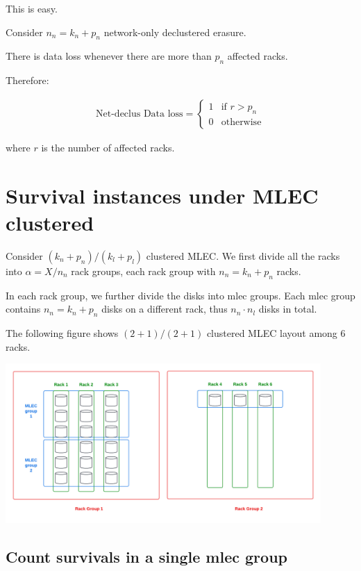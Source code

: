 \documentclass{article}
\begin{document}
This is easy.

Consider $n_n=k_n+p_n$ network-only declustered erasure.

There is data loss whenever there are more than $p_n$ affected racks.

Therefore:

\begin{eqnarray}
  \text{Net-declus Data loss} =
    \begin{cases}
      1 & \text{if $r > p_n$}\\
      0 & \text{otherwise}
    \end{cases}       
\label{eq:net_dp:1}
\end{eqnarray}

where $r$ is the number of affected racks.






\section{Survival instances under MLEC clustered}\label{sec-mlec}

Consider $(k_n+p_n)/(k_l+p_l)$ clustered MLEC.
We first divide all the racks into $\alpha = X / n_n$ rack groups, each rack group with $n_n=k_n+p_n$ racks.

In each rack group, we further divide the disks into mlec groups. Each mlec group contains $n_n=k_n+p_n$ disks on a different rack, thus $n_n \cdot n_l$ disks in total.

The following figure shows $(2+1)/(2+1)$ clustered MLEC layout among 6 racks.

\begin{center}
    \includegraphics[width=0.9\textwidth]{mlec_layout.png}
\end{center}


\subsection{Count survivals in a single mlec group}
\end{document}

